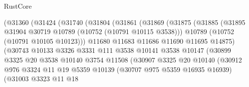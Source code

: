 \begin{lexlean}{RustCore}
\begin{coremodule}
                          (@31360
                            (@31424
                              (@31740
                                (@31804
                                  (@31861
                                    (@31869
                                      (@31875
                                        (@31885
                                          (@31895
                                            @31904
                                            @30719
                                            @10789
                                            (@10752 (@10791 @10115 @3538)))
                                          @10789
                                          (@10752 (@10791 @10105 @10123)))
                                        @11680
                                        @11683
                                        @11686
                                        @11690
                                        @11695
                                        @14875)
                                      (@30743
                                        @10133
                                        @3326
                                        @3331
                                        @111
                                        @3538
                                        @10141
                                        @3538
                                        @10147
                                        (@30899
                                          @3325
                                          @20
                                          @3538
                                          @10140
                                          @3754
                                          @11508
                                          (@30907
                                            @3325
                                            @20
                                            @10140
                                            (@30912
                                              @976
                                              @3324
                                              @11
                                              @19
                                              @5359
                                              @10139
                                              (@30707 @975 @5359 @16935 @16939)
                                              (@31003
                                                @3323
                                                @11
                                                @18

\end{coremodule}
\end{lexlean}
